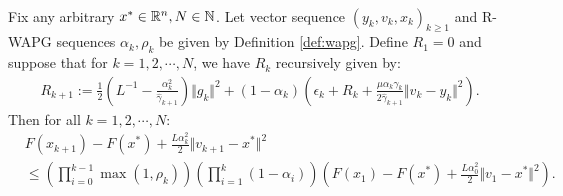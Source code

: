\documentclass[12pt]{article}
\begin{document}
    \begin{proposition}\label{prop:wagp-convergence}\; \\
        Fix any arbitrary $x^* \in \mathbb R^n, N \in \mathbb N$. 
        Let vector sequence $(y_k, v_{k}, x_{k})_{k \ge 1}$ and R-WAPG sequences $\alpha_k, \rho_k$ be given by Definition \ref{def:wapg}. 
        Define $R_1 = 0$ and suppose that for $k = 1, 2, \cdots, N$, we have $R_k$ recursively given by: 
        \begin{align*}
            R_{k + 1}
            := 
            \frac{1}{2}\left(
                L^{-1} - \frac{\alpha_k^2}{\hat \gamma_{k + 1}}
            \right)\Vert g_k\Vert^2
            + 
            (1 - \alpha_k)
            \left(
                \epsilon_k + R_k + 
                \frac{\mu\alpha_k\gamma_k}{2\hat \gamma_{k + 1}}
                \Vert v_k - y_k\Vert^2
            \right). 
        \end{align*} 
        Then for all $k = 1, 2, \cdots, N$: 
        \begin{align*}
            & F(x_{k + 1}) - F(x^*) + \frac{L \alpha_k^2}{2}\Vert v_{k + 1} - x^*\Vert^2
            \\
            &\le 
            \left(
                \prod_{i = 0}^{k - 1} \max(1, \rho_{k})
            \right)
            \left(
                \prod_{i = 1}^{k} \left(1  - \alpha_i\right)
            \right)
            \left(
                F(x_1) - F(x^*) + \frac{L\alpha_0^2}{2}\Vert v_1 - x^*\Vert^2
            \right). 
        \end{align*}
    \end{proposition}
\end{document}
